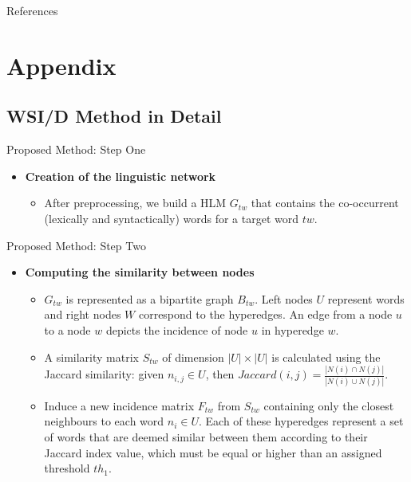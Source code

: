 \documentclass[10pt,xcolor=table]{beamer}
\begin{document}
\begin{frame}[allowframebreaks]{References}

\printbibliography
%

\end{frame}	
	
	
\section{Appendix}

\subsection{WSI/D Method in Detail}

\begin{frame}{Proposed Method: Step One}

\begin{itemize}
	\item \textbf{Creation of the linguistic network}
	\begin{itemize}
		\item After preprocessing, we build a HLM $G_{tw}$ that contains the co-occurrent (lexically and syntactically) words for a target word $tw$.
	\end{itemize}

\end{itemize}


\end{frame}

\begin{frame}{Proposed Method: Step Two}
\begin{itemize}

\item \textbf{Computing the similarity between nodes}
	\begin{itemize}
		\item $G_{tw}$ is represented as a bipartite graph $B_{tw}$. Left nodes $U$ represent words and right nodes $W$ correspond to the hyperedges. An edge from a node $u$ to a node $w$ depicts the incidence of node $u$ in hyperedge $w$.
		
		\item A similarity matrix $S_{tw}$ of dimension $|U|\times|U|$ is calculated using the Jaccard similarity: given $n_{i,j} \in U$, then $Jaccard(i,j)=\frac{|N(i)\cap N(j)|}{|N(i)\cup N(j)|}$.
	
		
		\item Induce a new incidence matrix $F_{tw}$ from $S_{tw}$ containing only the closest neighbours to each word $n_i \in U$. Each of these hyperedges represent a set of words that are deemed similar between them according to their Jaccard index value, which must be equal or higher than an assigned threshold $th_1$.
		
	\end{itemize}


\end{itemize}

\end{frame}
\end{document}

